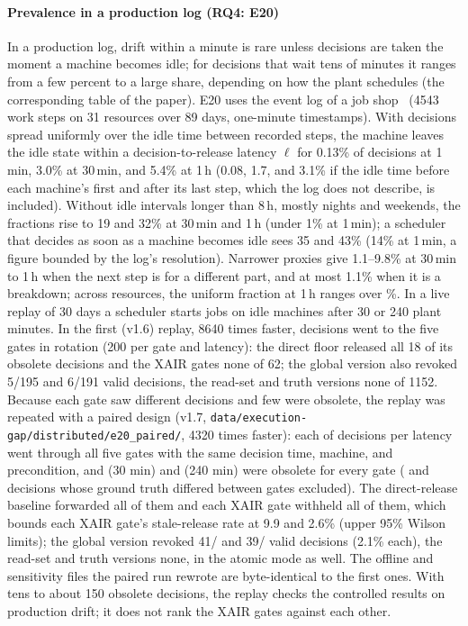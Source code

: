 \documentclass[11pt]{article}
\begin{document}
\paragraph{Prevalence in a production log (RQ4: E20)}
In a production log, drift within a minute is rare unless decisions are taken the moment a machine becomes idle; for decisions that wait tens of minutes it ranges from a few percent to a large share, depending on how the plant schedules (the corresponding table of the paper). E20 uses the event log of a job shop~ (4543 work steps on 31 resources over 89 days, one-minute timestamps). With decisions spread uniformly over the idle time between recorded steps, the machine leaves the idle state within a decision-to-release latency $\ell$ for 0.13\% of decisions at 1\,min, 3.0\% at 30\,min, and 5.4\% at 1\,h (0.08, 1.7, and 3.1\% if the idle time before each machine's first and after its last step, which the log does not describe, is included). Without idle intervals longer than 8\,h, mostly nights and weekends, the fractions rise to 19 and 32\% at 30\,min and 1\,h (under 1\% at 1\,min); a scheduler that decides as soon as a machine becomes idle sees 35 and 43\% (14\% at 1\,min, a figure bounded by the log's resolution). Narrower proxies give 1.1--9.8\% at 30\,min to 1\,h when the next step is for a different part, and at most 1.1\% when it is a breakdown; across resources, the uniform fraction at 1\,h ranges over \TwentyPerResource\%. In a live replay of 30 days a scheduler starts jobs on idle machines after 30 or 240 plant minutes. In the first (v1.6) replay, 8640 times faster, decisions went to the five gates in rotation (200 per gate and latency): the direct floor released all 18 of its obsolete decisions and the XAIR gates none of 62; the global version also revoked 5/195 and 6/191 valid decisions, the read-set and truth versions none of 1152. Because each gate saw different decisions and few were obsolete, the replay was repeated with a paired design (v1.7, \texttt{data/execution-gap/distributed/e20\_paired/}, 4320 times faster): each of \TwentyPDecThirty{} decisions per latency went through all five gates with the same decision time, machine, and precondition, and \TwentyPObsThirty{} (30 min) and \TwentyPObsTwoForty{} (240 min) were obsolete for every gate (\TwentyPDiscThirty{} and \TwentyPDiscTwoForty{} decisions whose ground truth differed between gates excluded). The direct-release baseline forwarded all of them and each XAIR gate withheld all of them, which bounds each XAIR gate's stale-release rate at 9.9 and 2.6\% (upper 95\% Wilson limits); the global version revoked 41/\TwentyPValThirty{} and 39/\TwentyPValTwoForty{} valid decisions (2.1\% each), the read-set and truth versions none, in the atomic mode as well. The offline and sensitivity files the paired run rewrote are byte-identical to the first ones. With tens to about 150 obsolete decisions, the replay checks the controlled results on production drift; it does not rank the XAIR gates against each other.
\end{document}
